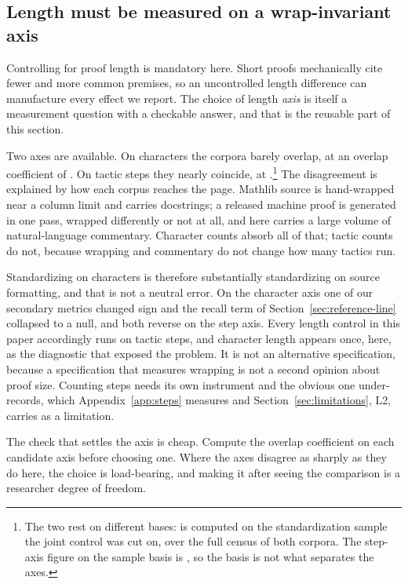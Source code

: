 
\subsection{Length must be measured on a wrap-invariant axis}
\label{sec:length-axis}

Controlling for proof length is mandatory here. Short proofs mechanically cite
fewer and more common premises, so an uncontrolled length difference can
manufacture every effect we report. The choice of length \emph{axis} is itself
a measurement question with a checkable answer, and that is the reusable part
of this section.

Two axes are available. On characters the corpora barely overlap, at an
overlap coefficient of \charOverlapSample{}. On tactic steps they nearly
coincide, at \stepOverlapCensus{}.\footnote{The two rest on different bases:
\charOverlapSample{} is computed on the standardization sample the joint
control was cut on, \stepOverlapCensus{} over the full census of both corpora.
The step-axis figure on the sample basis is \stepOverlapSample{}, so the basis
is not what separates the axes.} The disagreement is explained by how each
corpus reaches the page. Mathlib source is hand-wrapped near a column limit and
carries docstrings; a released machine proof is generated in one pass, wrapped
differently or not at all, and here carries a large volume of natural-language
commentary. Character counts absorb all of that; tactic counts do not, because
wrapping and commentary do not change how many tactics run.

Standardizing on characters is therefore substantially standardizing on source
formatting, and that is not a neutral error. On the character axis one of our
secondary metrics changed sign and the recall term of
Section~\ref{sec:reference-line} collapsed to a null, and both reverse on the
step axis. Every length control in this paper accordingly runs on tactic steps,
and character length appears once, here, as the diagnostic that exposed the
problem. It is not an alternative specification, because a specification that
measures wrapping is not a second opinion about proof size. Counting steps
needs its own instrument and the obvious one under-records, which
Appendix~\ref{app:steps} measures and Section~\ref{sec:limitations}, L2,
carries as a limitation.

The check that settles the axis is cheap. Compute the overlap coefficient on
each candidate axis before choosing one. Where the axes disagree as sharply as
they do here, the choice is load-bearing, and making it after seeing the
comparison is a researcher degree of freedom.
